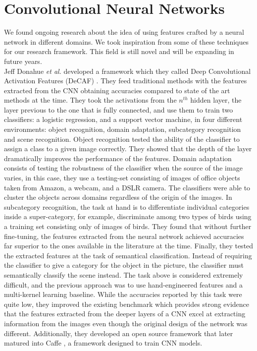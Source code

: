 \section{Convolutional Neural Networks}

We found ongoing research about the idea of using features crafted by a neural network in different domains. We took inspiration from some of these techniques for our research framework. This field is still novel and will be expanding in future years.\\

Jeff Donahue \textit{et al.} developed a framework which they called Deep Convolutional Activation Features (DeCAF) \cite{DBLP:journals/corr/DonahueJVHZTD13}. They feed traditional methods with the features extracted from the CNN obtaining accuracies compared to state of the art methods at the time. They took the activations from the $n^{th}$ hidden layer, the layer previous to the one that is fully connected, and use them to train two classifiers: a logistic regression, and a support vector machine, in four different environments: object recognition, domain adaptation, subcategory recognition and scene recognition. Object recognition tested the ability of the classifier to assign a class to a given image correctly. They showed that the depth of the layer dramatically improves the performance of the features. Domain adaptation consists of testing the robustness of the classifier when the source of the image varies, in this case, they use a testing-set consisting of images of office objects taken from Amazon, a webcam, and a DSLR camera. The classifiers were able to cluster the objects across domains regardless of the origin of the images. In subcategory recognition, the task at hand is to differentiate individual categories inside a super-category, for example, discriminate among two types of birds using a training set consisting only of images of birds. They found that without further fine-tuning, the features extracted from the neural network achieved accuracies far superior to the ones available in the literature at the time. Finally, they tested the extracted features at the task of semantical classification. Instead of requiring the classifier to give a category for the object in the picture, the classifier must semantically classify the scene instead. The task above is considered extremely difficult, and the previous approach was to use hand-engineered features and a multi-kernel learning baseline. While the accuracies reported by this task were quite low, they improved the existing benchmark which provides strong evidence that the features extracted from the deeper layers of a CNN excel at extracting information from the images even though the original design of the network was different. Additionally, they developed an open source framework that later matured into Caffe \cite{jia2014caffe}, a framework designed to train CNN models.\\

